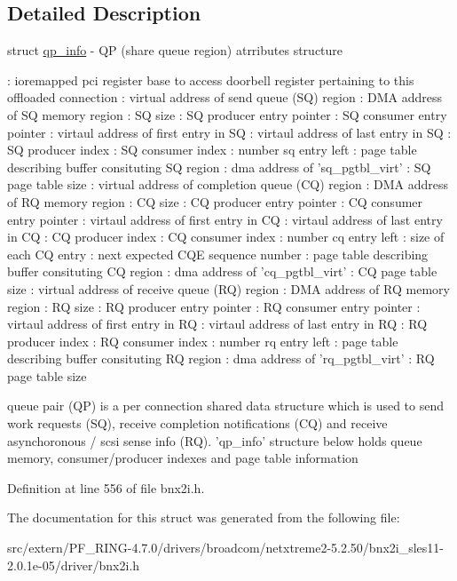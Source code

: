 \subsection{Detailed Description}
struct \hyperlink{structqp__info}{qp\_\-info} -\/ QP (share queue region) atrributes structure

: ioremapped pci register base to access doorbell register pertaining to this offloaded connection : virtual address of send queue (SQ) region : DMA address of SQ memory region : SQ size : SQ producer entry pointer : SQ consumer entry pointer : virtaul address of first entry in SQ : virtaul address of last entry in SQ : SQ producer index : SQ consumer index : number sq entry left : page table describing buffer consituting SQ region : dma address of 'sq\_\-pgtbl\_\-virt' : SQ page table size : virtual address of completion queue (CQ) region : DMA address of RQ memory region : CQ size : CQ producer entry pointer : CQ consumer entry pointer : virtaul address of first entry in CQ : virtaul address of last entry in CQ : CQ producer index : CQ consumer index : number cq entry left : size of each CQ entry : next expected CQE sequence number : page table describing buffer consituting CQ region : dma address of 'cq\_\-pgtbl\_\-virt' : CQ page table size : virtual address of receive queue (RQ) region : DMA address of RQ memory region : RQ size : RQ producer entry pointer : RQ consumer entry pointer : virtaul address of first entry in RQ : virtaul address of last entry in RQ : RQ producer index : RQ consumer index : number rq entry left : page table describing buffer consituting RQ region : dma address of 'rq\_\-pgtbl\_\-virt' : RQ page table size

queue pair (QP) is a per connection shared data structure which is used to send work requests (SQ), receive completion notifications (CQ) and receive asynchoronous / scsi sense info (RQ). 'qp\_\-info' structure below holds queue memory, consumer/producer indexes and page table information 

Definition at line 556 of file bnx2i.h.



The documentation for this struct was generated from the following file:\begin{DoxyCompactItemize}
\item 
src/extern/PF\_\-RING-\/4.7.0/drivers/broadcom/netxtreme2-\/5.2.50/bnx2i\_\-sles11-\/2.0.1e-\/05/driver/bnx2i.h\end{DoxyCompactItemize}
